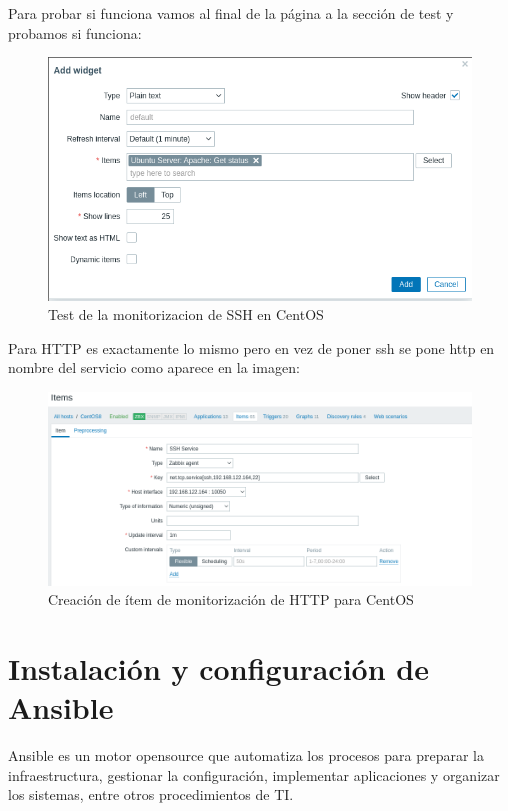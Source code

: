 Para probar si funciona vamos al final de la página a la sección de test y probamos si funciona:

\begin{figure}[H]
	\centering
	\includegraphics[scale=0.5]{graphics/img30}
	\caption{Test de la monitorizacion de SSH en CentOS}
\end{figure}

\newpage
Para HTTP es exactamente lo mismo pero en vez de poner ssh se pone http en nombre del servicio como aparece en la imagen:

\begin{figure}[H]
	\centering
	\includegraphics[scale=0.4]{graphics/img31}
	\caption{Creación de ítem de monitorización de HTTP para CentOS}
\end{figure}

\newpage
\section{Instalación y configuración de Ansible}
Ansible es un motor opensource que automatiza los procesos para preparar la infraestructura, gestionar la configuración, implementar aplicaciones y organizar los sistemas, entre otros procedimientos de TI.

